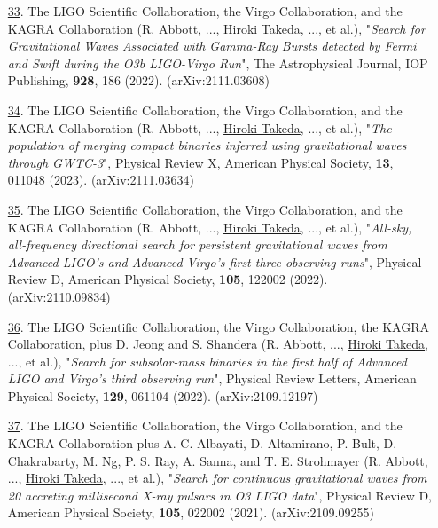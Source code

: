 \documentclass[uplatex, 12pt]{article}
\begin{document}
\begin{enumerate}
\item[\uline{33}.] The LIGO Scientific Collaboration, the Virgo Collaboration, and the KAGRA Collaboration (R. Abbott, ..., \uline{Hiroki Takeda}, ..., et al.),
"\emph{Search for Gravitational Waves Associated with Gamma-Ray Bursts detected by Fermi and Swift during the O3b LIGO-Virgo Run}",
The Astrophysical Journal, IOP Publishing, {\bf 928}, 186 (2022).
(arXiv:2111.03608) \\

\item[\uline{34}.] The LIGO Scientific Collaboration, the Virgo Collaboration, and the KAGRA Collaboration (R. Abbott, ..., \uline{Hiroki Takeda}, ..., et al.), "\emph{The population of merging compact binaries inferred using gravitational waves through GWTC-3}", Physical Review X, American Physical Society, {\bf 13}, 011048 (2023). (arXiv:2111.03634)\\

\item[\uline{35}.] The LIGO Scientific Collaboration, the Virgo Collaboration, and the KAGRA Collaboration (R. Abbott, ..., \uline{Hiroki Takeda}, ..., et al.), "\emph{All-sky, all-frequency directional search for persistent gravitational waves from Advanced LIGO's and Advanced Virgo's first three observing runs}", Physical Review D, American Physical Society, {\bf 105}, 122002 (2022). (arXiv:2110.09834)\\

\item[\uline{36}.] The LIGO Scientific Collaboration, the Virgo Collaboration, the KAGRA Collaboration, plus D. Jeong and S. Shandera (R. Abbott, ..., \uline{Hiroki Takeda}, ..., et al.), "\emph{Search for subsolar-mass binaries in the first half of Advanced LIGO and Virgo's third observing run}", Physical Review Letters, American Physical Society, {\bf 129}, 061104 (2022). (arXiv:2109.12197)\\

\item[\uline{37}.] The LIGO Scientific Collaboration, the Virgo Collaboration, and the KAGRA Collaboration plus A. C. Albayati, D. Altamirano, P. Bult, D. Chakrabarty, M. Ng, P. S. Ray, A. Sanna, and T. E. Strohmayer (R. Abbott, ..., \uline{Hiroki Takeda}, ..., et al.), "\emph{Search for continuous gravitational waves from 20 accreting millisecond X-ray pulsars in O3 LIGO data}", Physical Review D, American Physical Society, {\bf 105}, 022002 (2021). (arXiv:2109.09255)\\


\end{enumerate}
\end{document}
